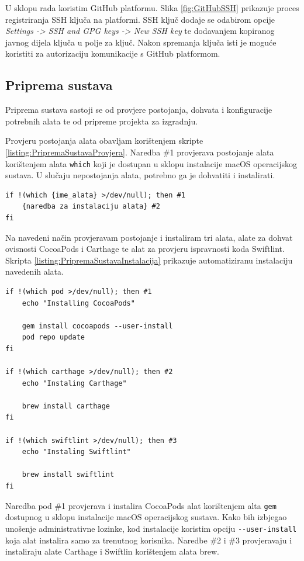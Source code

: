 \documentclass[times, utf8, diplomski, numeric]{fer}
\begin{document}
U sklopu rada koristim GitHub platformu. Slika \ref{fig:GitHubSSH} prikazuje proces registriranja SSH ključa na platformi. SSH ključ dodaje se odabirom opcije \textit{Settings -> SSH and GPG keys -> New SSH key} te dodavanjem kopiranog javnog dijela ključa u polje za ključ. Nakon spremanja ključa isti je moguće koristiti za autorizaciju komunikacije s GitHub platformom.

\subsection{Priprema sustava} \label{header:PripremaSustava}

Priprema sustava sastoji se od provjere postojanja, dohvata i konfiguracije potrebnih alata te od pripreme projekta za izgradnju.

Provjeru postojanja alata obavljam korištenjem skripte \ref{listing:PripremaSustavaProvjera}. Naredba \#1 provjerava postojanje alata korištenjem alata \verb|which| koji je dostupan u sklopu instalacije macOS operacijskog sustava. U slučaju nepostojanja alata, potrebno ga je dohvatiti i instalirati.

\begin{lstlisting}[caption=Provjera postojanja alata, label=listing:PripremaSustavaProvjera]
if !(which {ime_alata} >/dev/null); then #1
    {naredba za instalaciju alata} #2
fi
\end{lstlisting}

Na navedeni način provjeravam postojanje i instaliram tri alata, alate za dohvat ovisnosti CocoaPods i Carthage te alat za provjeru ispravnosti koda Swiftlint. Skripta \ref{listing:PripremaSustavaInstalacija} prikazuje automatiziranu instalaciju navedenih alata.


\begin{lstlisting}[caption=Automatizirana instalacija alata, label=listing:PripremaSustavaInstalacija]
if !(which pod >/dev/null); then #1
    echo "Installing CocoaPods"

    gem install cocoapods --user-install
    pod repo update
fi

if !(which carthage >/dev/null); then #2
    echo "Instaling Carthage"

    brew install carthage
fi

if !(which swiftlint >/dev/null); then #3
    echo "Instaling Swiftlint"

    brew install swiftlint
fi
\end{lstlisting}

Naredba pod \#1 provjerava i instalira CocoaPods alat korištenjem alta \verb|gem| dostupnog u sklopu instalacije macOS operacijskog sustava. Kako bih izbjegao unošenje administrativne lozinke, kod instalacije koristim opciju \verb|--user-install| koja alat instalira samo za trenutnog korisnika. Naredbe \#2 i \#3 provjeravaju i instaliraju alate Carthage i Swiftlin korištenjem alata brew.
\end{document}
